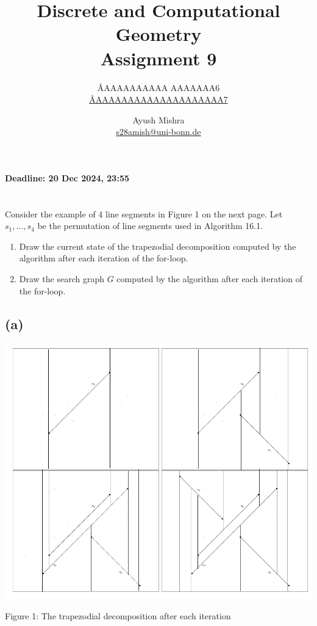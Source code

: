\documentclass{article}
\title{Discrete and Computational Geometry \\ Assignment 9}
\author{
  \AA{AAAAAAAAAA AAAAAAA}{6} \\
  \href{mailto:\AA{AAAAAAAAAAAAAAAAAAAA}{7}}{\AA{AAAAAAAAAAAAAAAAAAAA}{7}}
  \and
  Ayush Mishra \\
  \href{mailto:s28amish@uni-bonn.de}{s28amish@uni-bonn.de}
}
\begin{document}
  \maketitle
  \begin{center}
    { \bfseries Deadline: 20 Dec 2024, 23:55 }
  \end{center}

  \section{}
  \begin{centerframebox}
    Consider the example of 4 line segments in Figure 1 on the next page. Let $s_1, \ldots, s_4$ be the permutation of line segments used in Algorithm 16.1.

    \begin{enumerate}[label=(\alph*)]
      \item Draw the current state of the trapezodial decomposition computed by the algorithm after each iteration of the for-loop.
      \item Draw the search graph $G$ computed by the algorithm after each iteration of the for-loop.
    \end{enumerate}
  \end{centerframebox}
  \subsection{(a)}
  \begin{center}
    \includegraphics[width=.7\textwidth]{trapezoidal-1}

    Figure 1: The trapezodial decomposition after each iteration
  \end{center}
\end{document}
